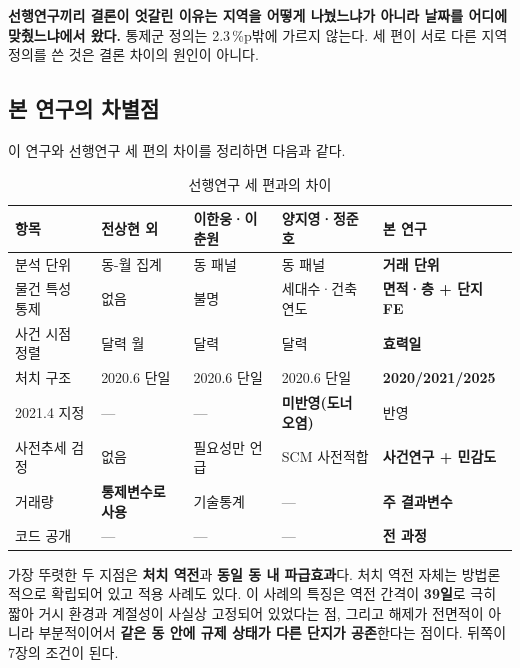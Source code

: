 \textbf{선행연구끼리 결론이 엇갈린 이유는 지역을 어떻게 나눴느냐가 아니라
날짜를 어디에 맞췄느냐에서 왔다.} 통제군 정의는 2.3\,\%p밖에 가르지 않는다.
세 편이 서로 다른 지역 정의를 쓴 것은 결론 차이의 원인이 아니다.

\subsection{본 연구의 차별점}

이 연구와 선행연구 세 편의 차이를 정리하면 다음과 같다.

\begin{table}[htbp]
  \centering
  \caption{선행연구 세 편과의 차이}
  \label{tab:diff}
  \begin{tabular}{lllll}
    \toprule
    \textbf{항목} & \textbf{전상현 외} & \textbf{이한웅·이춘원} &
    \textbf{양지영·정준호} & \textbf{본 연구} \\
    \midrule
    분석 단위 & 동-월 집계 & 동 패널 & 동 패널 & \textbf{거래 단위} \\
    물건 특성 통제 & 없음 & 불명 & 세대수·건축연도 &
      \textbf{면적·층 + 단지 FE} \\
    사건 시점 정렬 & 달력 월 & 달력 & 달력 & \textbf{효력일} \\
    처치 구조 & 2020.6 단일 & 2020.6 단일 & 2020.6 단일 &
      \textbf{2020/2021/2025} \\
    2021.4 지정 & --- & --- & \textbf{미반영(도너 오염)} & 반영 \\
    사전추세 검정 & 없음 & 필요성만 언급 & SCM 사전적합 &
      \textbf{사건연구 + 민감도} \\
    거래량 & \textbf{통제변수로 사용} & 기술통계 & --- & \textbf{주 결과변수} \\
    코드 공개 & --- & --- & --- & \textbf{전 과정} \\
    \bottomrule
  \end{tabular}
\end{table}

가장 뚜렷한 두 지점은 \textbf{처치 역전}과 \textbf{동일 동 내 파급효과}다. 처치
역전 자체는 방법론적으로 확립되어 있고\citep{dechaisemartin2020twoway} 적용
사례도 있다. 이 사례의 특징은 역전 간격이 \textbf{39일}로 극히 짧아 거시 환경과
계절성이 사실상 고정되어 있었다는 점, 그리고 해제가 전면적이 아니라 부분적이어서
\textbf{같은 동 안에 규제 상태가 다른 단지가 공존}한다는 점이다. 뒤쪽이 7장의
조건이 된다.
